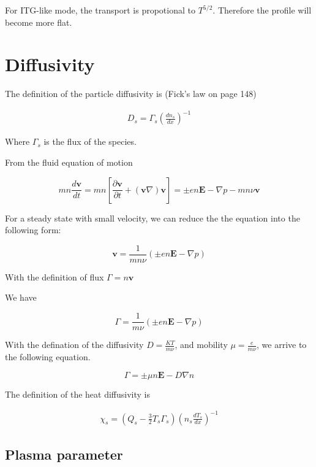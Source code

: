 For ITG-like mode, the transport is propotional to $T^{5/2}$. Therefore the profile will become more flat. 

\section{Diffusivity}

The definition of the particle diffusivity is (Fick's law on page 148) \cite{Chen}

\begin{eqnarray}
D_s = \Gamma_s(\frac{dn_s}{dx})^{-1}
\end{eqnarray}

Where $\Gamma_s$ is the flux of the species.

From the fluid equation of motion

\begin{equation}
    mn\frac{d\textbf{v}}{dt}=mn[\frac{\partial \textbf{v}}{\partial t}+(\textbf{v}\nabla)\textbf{v}]=\pm en \textbf{E}-\nabla p-mn\nu \textbf{v}
\end{equation}

For a steady state with small velocity, we can reduce the the equation into the following form: 

\begin{equation}
    \textbf{v}=\frac{1}{mn\nu}(\pm en \textbf{E}-\nabla p)
\end{equation}

With the definition of flux $\Gamma = n\textbf{v}$

We have

\begin{equation}
    \Gamma=\frac{1}{m\nu}(\pm en \textbf{E}-\nabla p)
\end{equation}

With the defination of the diffusivity $D=\frac{KT}{m\nu}$, and mobility $\mu=\frac{e}{m\nu}$, we arrive to the following equation.

\begin{equation}
    \Gamma =\pm \mu n \textbf{E} -D\nabla n 
\end{equation}



The definition of the heat diffusivity is

\begin{eqnarray}
\chi_s = (Q_s-\frac{3}{2}T_s\Gamma_s)(n_s \frac{dT_s}{dx})^{-1}
\end{eqnarray}

\subsection{Plasma parameter}

